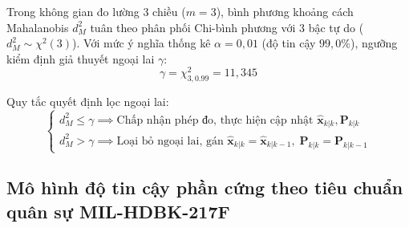 Trong không gian đo lường 3 chiều ($m=3$), bình phương khoảng cách Mahalanobis $d_M^2$ tuân theo phân phối Chi-bình phương với 3 bậc tự do ($d_M^2 \sim \chi^2(3)$). Với mức ý nghĩa thống kê $\alpha = 0{,}01$ (độ tin cậy $99{,}0\%$), ngưỡng kiểm định giả thuyết ngoại lai $\gamma$:
\begin{equation}
\gamma = \chi^2_{3, 0.99} = 11{,}345
\label{eq:chi-square-threshold-value}
\end{equation}

Quy tắc quyết định lọc ngoại lai:
\begin{equation}
\begin{cases}
d_M^2 \le \gamma \implies \text{Chấp nhận phép đo, thực hiện cập nhật } \hat{\mathbf{x}}_{k|k}, \mathbf{P}_{k|k} \\
d_M^2 > \gamma \implies \text{Loại bỏ ngoại lai, gán } \hat{\mathbf{x}}_{k|k} = \hat{\mathbf{x}}_{k|k-1}, \; \mathbf{P}_{k|k} = \mathbf{P}_{k|k-1}
\end{cases}
\label{eq:mahalanobis-decision-rule}
\end{equation}

\begin{table}[H]
\centering
\caption{Hiệu quả loại trừ nhiễu đột biến và bảo toàn quỹ đạo của cổng Mahalanobis $\chi^2$}
\label{tab:mahalanobis-gating-results}
\end{table}

\subsection{Mô hình độ tin cậy phần cứng theo tiêu chuẩn quân sự MIL-HDBK-217F}

